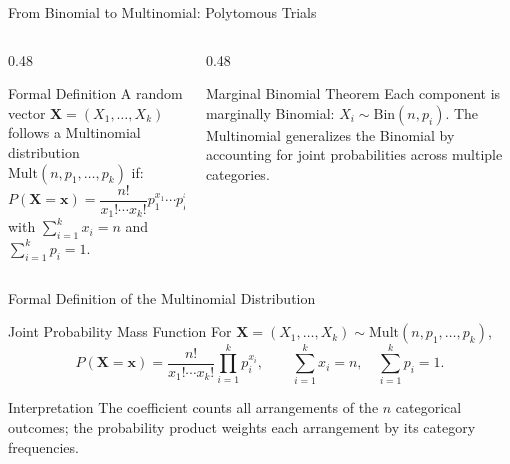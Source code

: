 \documentclass[aspectratio=169,xcolor={dvipsnames,table}]{beamer}
\begin{document}
\begin{frame}{From Binomial to Multinomial: Polytomous Trials}
	\vspace{-0.15cm}
	\begin{columns}[T]
		\begin{column}{0.48\textwidth}
			\begin{block}{Formal Definition}
				\footnotesize
				A random vector $\bm{X} = (X_{1}, \dots, X_{k})$ follows a Multinomial distribution $\text{Mult}(n, p_{1}, \dots, p_{k})$ if:
				$$P(\bm{X} = \bm{x}) = \dfrac{n!}{x_{1}! \cdots x_{k}!} p_{1}^{x_{1}} \cdots p_{k}^{x_{k}}$$
				with $\sum_{i=1}^{k} x_{i} = n$ and $\sum_{i=1}^{k} p_{i} = 1$.
			\end{block}
		\end{column}
		\begin{column}{0.48\textwidth}
			\begin{alertblock}{Marginal Binomial Theorem}
				\footnotesize
				Each component is marginally Binomial: $X_{i} \sim \text{Bin}(n, p_{i})$. The Multinomial generalizes the Binomial by accounting for joint probabilities across multiple categories.
			\end{alertblock}
		\end{column}
	\end{columns}
\end{frame}

\begin{frame}{Formal Definition of the Multinomial Distribution}
\vspace{-0.15cm}
\begin{block}{Joint Probability Mass Function}
\footnotesize
For $\bm{X}=(X_{1},\ldots,X_{k})\sim\text{Mult}(n,p_{1},\ldots,p_{k})$,
\[
P(\bm{X}=\bm{x})=\frac{n!}{x_{1}!\cdots x_{k}!}
\prod_{i=1}^{k}p_{i}^{x_{i}},\qquad
\sum_{i=1}^{k}x_{i}=n,\quad \sum_{i=1}^{k}p_{i}=1.
\]
\end{block}
\begin{alertblock}{Interpretation}
\scriptsize
The coefficient counts all arrangements of the $n$ categorical outcomes; the
probability product weights each arrangement by its category frequencies.
\end{alertblock}
\end{frame}
\end{document}
